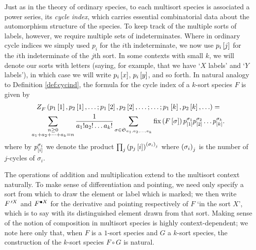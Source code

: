 \documentclass[distribution,draft]{brandiss} %
\numberwithin{section}{chapter}
\numberwithin{figure}{chapter}
\begin{document}
Just as in the theory of ordinary species, to each multisort species is associated a power series, its \emph{cycle index}, which carries essential combinatorial data about the automorphism structure of the species.
To keep track of the multiple sorts of labels, however, we require multiple sets of indeterminates.
Where in ordinary cycle indices we simply used $p_{i}$ for the $i$th indeterminate, we now use $p_{i} \sbrac{j}$ for the $i$th indeterminate of the $j$th sort.
In some contexts with small $k$, we will denote our sorts with letters (saying, for example, that we have `$X$ labels' and `$Y$ labels'), in which case we will write $p_{i} \sbrac{x}$, $p_{i} \sbrac{y}$, and so forth.
In natural analogy to Definition \ref{def:cycind}, the formula for the cycle index of a $k$-sort species $F$ is given by
\begin{multline}
  \label{eq:multcycinddef}
  \civars{F}{p_{1} \sbrac{1}, p_{2} \sbrac{1}, \dots; p_{1} \sbrac{2}, p_{2} \sbrac{2}, \dots; \dots; p_{1} \sbrac{k}, p_{2} \sbrac{k}, \dots} = \\
  \sum_{\substack{n \geq 0 \\ a_{1} + a_{2} + \dots + a_{k} = n}} \frac{1}{a_{1}! a_{2}! \dots a_{k}!} \sum_{\sigma \in \symgp{a_{1}, a_{2}, \dots, a_{k}}} \fix \pbrac{F \sbrac{\sigma}} p^{\sigma_{1}}_{\sbrac{1}} p^{\sigma_{2}}_{\sbrac{2}} \dots p^{\sigma_{k}}_{\sbrac{k}}.
\end{multline}
where by $p^{\sigma_{i}}_{\sbrac{i}}$ we denote the product $\prod_{j} \pbrac{p_{j} \sbrac{i}}^{\pbrac{\sigma_{i}}_{j}}$ where $\pbrac{\sigma_{i}}_{j}$ is the number of $j$-cycles of $\sigma_{i}$.

The operations of addition and multiplication extend to the multisort context naturally.
To make sense of differentiation and pointing, we need only specify a sort from which to draw the element or label which is marked; we then write $\deriv[X]{F}$ and $\pointed[X]{F}$ for the derivative and pointing respectively of $F$ `in the sort $X$', which is to say with its distinguished element drawn from that sort.
Making sense of the notion of composition in multisort species is highly context-dependent; we note here only that, when $F$ is a $1$-sort species and $G$ a $k$-sort species, the construction of the $k$-sort species $F \circ G$ is natural. 
\end{document}
